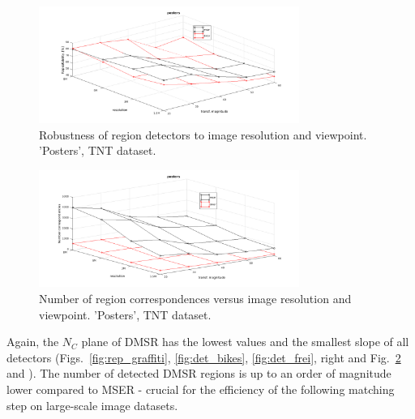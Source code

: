 \documentclass[conference,compsoc]{IEEEtran}
\begin{document}
\begin{figure}[htb]

\begin{minipage}[b]{.9\linewidth}
  \centering
  \centerline{\includegraphics[width=8.5cm]{posters_rep}}
\end{minipage}
\hfill
\caption{Robustness of region detectors to image resolution and viewpoint. 'Posters', TNT dataset.}
\label{fig:tnt}
\vspace{-0.25cm}
\end{figure}
\begin{figure}[htb]

\begin{minipage}[b]{0.9\linewidth}
  \centering
  \centerline{\includegraphics[width=8.5cm]{posters_numreg}}
\end{minipage}
\caption{Number of region correspondences versus image resolution and viewpoint. 'Posters', TNT dataset.}
\label{fig:tnt_numreg}
%
\end{figure}

Again, the $N_C$ plane of DMSR has the lowest values and the smallest slope of all detectors (Figs.~\ref{fig:rep_graffiti}, \ref{fig:det_bikes}, \ref{fig:det_frei}, right and Fig.~\ref{fig:tnt_numreg} and \cite{elena_ranguelova_2016_45156}). The number of detected DMSR regions is up to an order of magnitude lower compared to MSER - crucial for the efficiency of the following matching step on large-scale image datasets.
\end{document}

